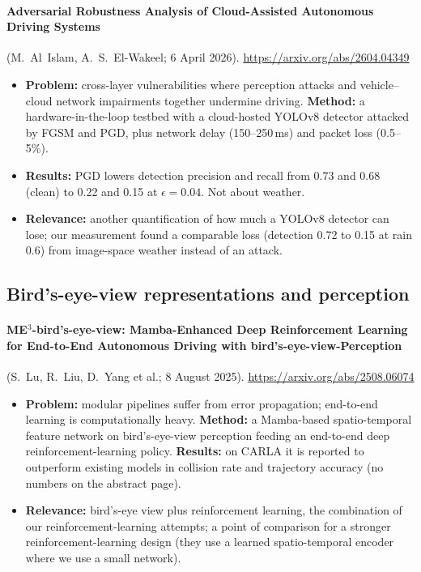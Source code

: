 \paragraph{Adversarial Robustness Analysis of Cloud-Assisted Autonomous Driving Systems} (M.~Al~Islam, A.~S.~El-Wakeel; 6 April 2026). \url{https://arxiv.org/abs/2604.04349}
\begin{itemize}
\item \textbf{Problem:} cross-layer vulnerabilities where perception attacks and vehicle--cloud network impairments together undermine driving. \textbf{Method:} a hardware-in-the-loop testbed with a cloud-hosted YOLOv8 detector attacked by FGSM and PGD, plus network delay (150--250\,ms) and packet loss (0.5--5\%).
\item \textbf{Results:} PGD lowers detection precision and recall from 0.73 and 0.68 (clean) to 0.22 and 0.15 at $\epsilon=0.04$. Not about weather.
\item \textbf{Relevance:} another quantification of how much a YOLOv8 detector can lose; our measurement found a comparable loss (detection 0.72 to 0.15 at rain 0.6) from image-space weather instead of an attack.
\end{itemize}

\subsection{Bird's-eye-view representations and perception}

\paragraph{ME$^3$-bird's-eye-view: Mamba-Enhanced Deep Reinforcement Learning for End-to-End Autonomous Driving with bird's-eye-view-Perception} (S.~Lu, R.~Liu, D.~Yang et al.; 8 August 2025). \url{https://arxiv.org/abs/2508.06074}
\begin{itemize}
\item \textbf{Problem:} modular pipelines suffer from error propagation; end-to-end learning is computationally heavy. \textbf{Method:} a Mamba-based spatio-temporal feature network on bird's-eye-view perception feeding an end-to-end deep reinforcement-learning policy. \textbf{Results:} on CARLA it is reported to outperform existing models in collision rate and trajectory accuracy (no numbers on the abstract page).
\item \textbf{Relevance:} bird's-eye view plus reinforcement learning, the combination of our reinforcement-learning attempts; a point of comparison for a stronger reinforcement-learning design (they use a learned spatio-temporal encoder where we use a small network).
\end{itemize}


